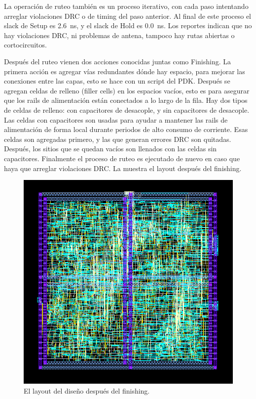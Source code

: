 \documentclass[a4paper, twoside, 11pt]{report}
\begin{document}
La operación de ruteo también es un proceso iterativo, con cada paso intentando arreglar violaciones DRC o de timing del paso anterior. Al final de este proceso el slack de Setup es \SI{2.6}{\nano\second}, y el slack de Hold es \SI{0.0}{\nano\second}. Los reportes indican que no hay violaciones DRC, ni problemas de antena, tampoco hay rutas abiertas o cortocircuitos.

Después del ruteo vienen dos acciones conocidas juntas como Finishing. La primera acción es agregar vías redundantes dónde hay espacio, para mejorar las conexiones entre las capas, esto se hace con un script del PDK. Después se agregan celdas de relleno (filler cells) en los espacios vacíos, esto es para asegurar que los rails de alimentación están conectados a lo largo de la fila. Hay dos tipos de celdas de relleno: con capacitores de desacople, y sin capacitores de desacople. Las celdas con capacitores son usadas para ayudar a mantener las rails de alimentación de forma local durante periodos de alto consumo de corriente. Esas celdas son agregadas primero, y las que generan errores DRC son quitadas. Después, los sitios que se quedan vacíos son llenados con las celdas sin capacitores. Finalmente el proceso de ruteo es ejecutado de nuevo en caso que haya que arreglar violaciones DRC. La  muestra el layout después del finishing.

\begin{figure}[htb]
  \centering
  \includegraphics[width=1.0\textwidth]{./img/pnr_out}
  \caption{El layout del diseño después del finishing.}
  \label{fig:pnr_out}
\end{figure}
\end{document}
